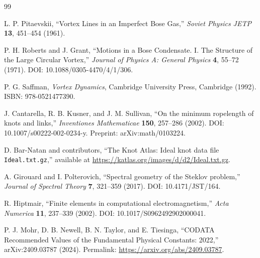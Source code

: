 \documentclass[11pt]{article}
\begin{document}
\begin{thebibliography}{99}

L. P. Pitaevskii, ``Vortex Lines in an Imperfect Bose Gas,''
\emph{Soviet Physics JETP} \textbf{13}, 451--454 (1961).

P. H. Roberts and J. Grant, ``Motions in a Bose Condensate. I. The Structure of the Large Circular Vortex,''
\emph{Journal of Physics A: General Physics} \textbf{4}, 55--72 (1971).
DOI: 10.1088/0305-4470/4/1/306.

P. G. Saffman, \emph{Vortex Dynamics}, Cambridge University Press, Cambridge (1992).
ISBN: 978-0521477390.

J. Cantarella, R. B. Kusner, and J. M. Sullivan,
``On the minimum ropelength of knots and links,''
\emph{Inventiones Mathematicae} \textbf{150}, 257--286 (2002).
DOI: 10.1007/s00222-002-0234-y.
Preprint: arXiv:math/0103224.

D. Bar-Natan and contributors,
``The Knot Atlas: Ideal knot data file \texttt{Ideal.txt.gz},''
available at \url{https://katlas.org/images/d/d2/Ideal.txt.gz}.

A. Girouard and I. Polterovich,
``Spectral geometry of the Steklov problem,''
\emph{Journal of Spectral Theory} \textbf{7}, 321--359 (2017).
DOI: 10.4171/JST/164.

R. Hiptmair,
``Finite elements in computational electromagnetism,''
\emph{Acta Numerica} \textbf{11}, 237--339 (2002).
DOI: 10.1017/S0962492902000041.

P. J. Mohr, D. B. Newell, B. N. Taylor, and E. Tiesinga,
``CODATA Recommended Values of the Fundamental Physical Constants: 2022,''
arXiv:2409.03787 (2024).
Permalink: \url{https://arxiv.org/abs/2409.03787}.

\end{thebibliography}
\end{document}
